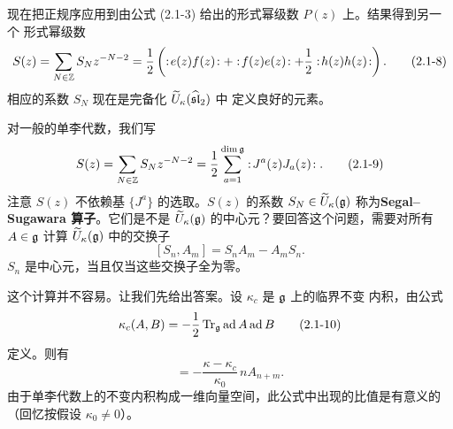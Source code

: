 现在把正规序应用到由公式 (2.1-3) 给出的形式幂级数 $P(z)$ 上。结果得到另一个
形式幂级数
\begin{equation}
    S(z)=\sum_{N\in\mathbb{Z}}S_Nz^{-N-2}
    =\frac12\left(:\!e(z)f(z)\!:+:\!f(z)e(z)\!:
    +\frac12:\!h(z)h(z)\!:\right).
    \tag{2.1-8}
\end{equation}
相应的系数 $S_N$ 现在是完备化 $\widetilde U_\kappa(\widehat{\mathfrak{sl}}_2)$ 中
定义良好的元素。

对一般的单李代数，我们写
\begin{equation}
    S(z)=\sum_{N\in\mathbb{Z}}S_Nz^{-N-2}
    =\frac12\sum_{a=1}^{\dim\mathfrak{g}}:\!J^a(z)J_a(z)\!:.
    \tag{2.1-9}
\end{equation}
注意 $S(z)$ 不依赖基 $\{J^a\}$ 的选取。$S(z)$ 的系数
$S_N\in\widetilde U_\kappa(\mathfrak{g})$ 称为\textbf{Segal--Sugawara 算子}。它们是不是
$\widetilde U_\kappa(\mathfrak{g})$ 的中心元？要回答这个问题，需要对所有 $A\in\mathfrak{g}$
计算 $\widetilde U_\kappa(\mathfrak{g})$ 中的交换子
\[
    [S_n,A_m]=S_nA_m-A_mS_n.
\]
$S_n$ 是中心元，当且仅当这些交换子全为零。

这个计算并不容易。让我们先给出答案。设 $\kappa_c$ 是 $\mathfrak{g}$ 上的临界不变
内积，由公式
\begin{equation}
    \kappa_c(A,B)=-\frac12\operatorname{Tr}_{\mathfrak{g}}\operatorname{ad}A\operatorname{ad}B
    \tag{2.1-10}
\end{equation}
定义。则有
\begin{equation}
    [S_n,A_m]=-\frac{\kappa-\kappa_c}{\kappa_0}\,nA_{n+m}.
    \tag{2.1-11}
\end{equation}
由于单李代数上的不变内积构成一维向量空间，此公式中出现的比值是有意义的
（回忆按假设 $\kappa_0\ne0$）。


